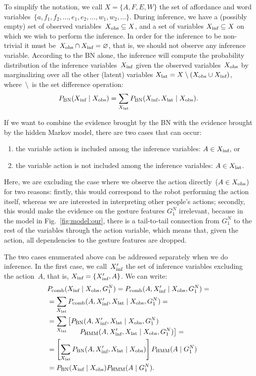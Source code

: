 To simplify the notation, we call $X = \{A, F, E, W\}$ the set of affordance and word variables~$\{a, f_1, f_2, \dots, e_1, e_2, \dots, w_1, w_2, \dots\}$.
During inference, we have a (possibly empty) set of observed variables~$X_\text{obs} \subseteq X$, and a set of variables $X_\text{inf} \subseteq X$ on which we wish to perform the inference.
In order for the inference to be non-trivial it must be~$X_\text{obs} \cap X_\text{inf} = \varnothing$, that is, we should not observe any inference variable.
According to the \ac{BN} alone, the inference will compute the probability distribution of the inference variables~$X_\text{inf}$ given the observed variables~$X_\text{obs}$ by marginalizing over all the other (latent) variables $X_\text{lat} = X \setminus (X_\text{obs} \cup X_\text{inf})$, where~$\setminus$~is the set difference operation:
\begin{eqnarray*}
 P_{\text{BN}}(X_\text{inf} \mid X_\text{obs}) = \sum_{X_\text{lat}} P_{\text{BN}}(X_\text{inf}, X_\text{lat} \mid X_\text{obs}).
\end{eqnarray*}

If we want to combine the evidence brought by the \ac{BN} with the evidence brought by the hidden Markov model, there are two cases that can occur:
\begin{enumerate}
\item the variable action is included among the inference variables: $A \in X_\text{inf}$, or

\item the variable action is not included among the inference variables: $A \in X_\text{lat}$.
\end{enumerate}

Here, we are excluding the case where we observe the action directly~($A\in X_\text{obs}$) for two reasons: firstly, this would correspond to the robot performing the action itself, whereas we are interested in interpreting other people's actions;
secondly, this would make the evidence on the gesture features $G_1^N$ irrelevant, because in the model in Fig.~\ref{fig:model:our}, there is a tail-to-tail connection from $G_1^N$ to the rest of the variables through the action variable, which means that, given the action, all dependencies to the gesture features are dropped.

The two cases enumerated above can be addressed separately when we do inference.
In the first case, we call~$X_\text{inf}^\prime$ the set of inference variables excluding the action~$A$, that is, $X_\text{inf} = \{X_\text{inf}^\prime, A\}$.
We can write:
\begin{align*}
  & P_\text{comb}(X_\text{inf} \mid  X_\text{obs}, G_1^N) = P_\text{comb}(A, X_\text{inf}^\prime \mid  X_\text{obs}, G_1^N)= \\
  &= \sum_{X_\text{lat}} P_\text{comb}(A, X_\text{inf}^\prime, X_\text{lat} \mid X_\text{obs}, G_1^N)=\\
  &= \sum_{X_\text{lat}} \left[P_{\text{BN}}(A, X_\text{inf}^\prime, X_\text{lat} \mid X_\text{obs}, G_1^N)\right. \\[-4mm]
    & \mspace{80mu} \left.P_{\text{HMM}}(A, X_\text{inf}^\prime, X_\text{lat} \mid X_\text{obs}, G_1^N)\right]= \\
  &= \left[\sum_{X_\text{lat}} P_{\text{BN}}(A, X_\text{inf}^\prime, X_\text{lat} \mid X_\text{obs})\right] P_{\text{HMM}}(A \mid G_1^N) \\
  &= P_{\text{BN}}(X_\text{inf} \mid X_\text{obs}) P_{\text{HMM}}(A \mid G_1^N).
\end{align*}

